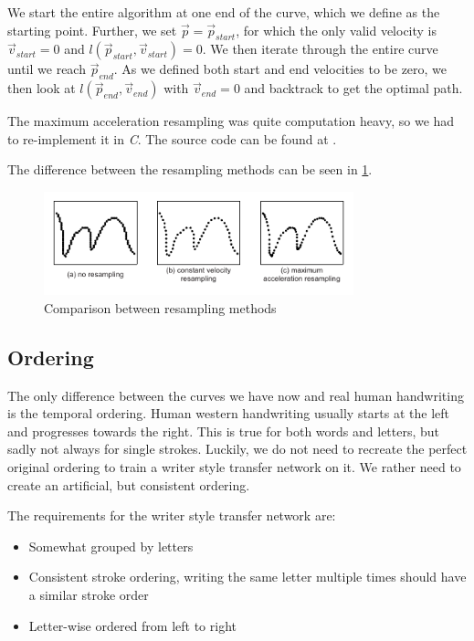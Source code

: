 We start the entire algorithm at one end of the curve, which we define as the starting point. Further, we set $\vec{p} = \vec{p}_{start}$, for which the only valid velocity is $\vec{v}_{start} = 0$ and $l(\vec{p}_{start}, \vec{v}_{start}) = 0$. We then iterate through the entire curve until we reach $\vec{p}_{end}$. As we defined both start and end velocities to be zero, we then look at $l(\vec{p}_{end}, \vec{v}_{end})$ with $\vec{v}_{end} = 0$ and backtrack to get the optimal path.

The maximum acceleration resampling was quite computation heavy, so we had to re-implement it in \emph{C}. The source code can be found at \cite{thesisSourceCode}.

The difference between the resampling methods can be seen in \cref{fig:resamplingComparison}.

\begin{figure}
  \centering
  \includegraphics[width=0.8\textwidth]{../assets/sampling/sampling/resampling_comparison.pdf}
  \caption[Comparison between resampling methods]{Comparison between resampling methods}
  \label{fig:resamplingComparison}
\end{figure}

\subsection{Ordering}
The only difference between the curves we have now and real human handwriting is the temporal ordering. Human western handwriting usually starts at the left and progresses towards the right. This is true for both words and letters, but sadly not always for single strokes. Luckily, we do not need to recreate the perfect original ordering to train a writer style transfer network on it. We rather need to create an artificial, but consistent ordering.

The requirements for the writer style transfer network are:
\begin{itemize}[topsep=0pt,itemsep=-1ex,partopsep=1ex,parsep=1ex]
\item Somewhat grouped by letters
\item Consistent stroke ordering, writing the same letter multiple times should have a similar stroke order
\item Letter-wise ordered from left to right
\end{itemize}

